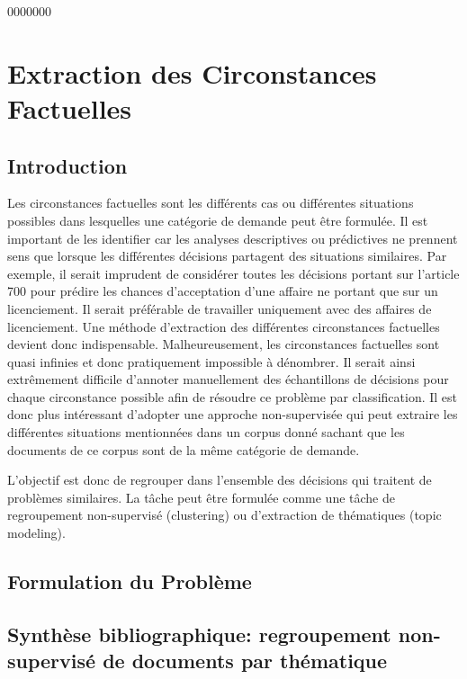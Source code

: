  0000000\chapter{Extraction des Circonstances Factuelles}
\label{sec:similarite}

% 

\section{Introduction}
\label{sec:similarite:introduction}
Les circonstances factuelles sont les différents cas ou différentes situations possibles dans lesquelles une catégorie de demande peut être formulée. Il est important de les identifier car les analyses descriptives ou prédictives ne prennent sens que lorsque les différentes décisions partagent des situations similaires. Par exemple, il serait imprudent de considérer toutes les décisions portant sur l'article 700 pour prédire les chances d'acceptation d'une affaire ne portant que sur un licenciement. Il serait préférable de travailler uniquement avec des affaires de licenciement. Une méthode d'extraction des différentes circonstances factuelles devient donc indispensable. Malheureusement, les circonstances factuelles sont quasi infinies et donc pratiquement impossible à dénombrer. Il serait ainsi extrêmement difficile d'annoter manuellement des échantillons de décisions pour chaque circonstance possible afin de résoudre ce problème par classification. Il est donc plus intéressant d'adopter une approche non-supervisée qui peut extraire les différentes situations mentionnées dans un corpus donné sachant que les documents de ce corpus sont de la même catégorie de demande.

L’objectif est donc de regrouper dans l’ensemble des décisions qui traitent de problèmes similaires. La tâche peut être formulée comme une tâche de regroupement non-supervisé (clustering) ou d’extraction de thématiques (topic modeling). 
\section{Formulation du Problème}
\label{sec:similarite:probleme}


\section{Synthèse bibliographique: regroupement non-supervisé de documents par thématique}
\label{sec:similarite:biblio}


